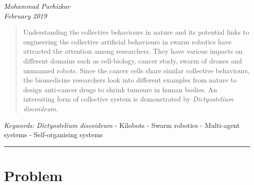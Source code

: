 \documentclass[10.5pt,a4paper]{article}
\begin{document}
\begin{center}
{ }
\vspace{2mm}

{\selectfont\textit{Mohammad Parhizkar \\ \small{February 2019} }}


\end{center}
\begin{abstract}
Understanding the collective behaviours in nature and its potential links to engineering the collective artificial behaviours in swarm robotics  have attracted the attention among researchers. They have various impacts on different domains such as cell-biology, cancer study, swarm of drones and unmanned robots. Since the cancer cells share similar collective behaviours, the biomedicine researchers look into different  examples from nature to design anti-cancer drugs to shrink tumours in human bodies. An interesting form of collective system is demonstrated by {\textit{Dictyostelium discoideum}}. 

   \end{abstract}

{\footnotesize\textit{Keywords:} {\textit{Dictyostelium discoideum}} - Kilobots - Swarm robotics - Multi-agent systems - Self-organising systems}

{\begin{center}\noindent\rule{14cm}{0.4pt}\end{center}}
\section{Problem}





 
 


 
\end{document}
